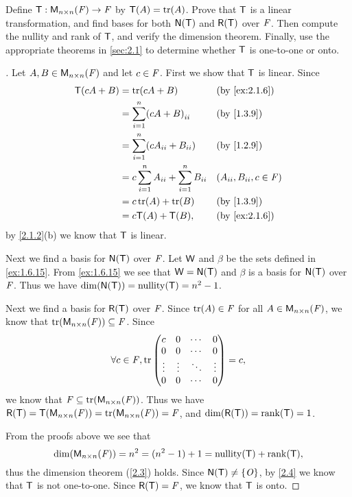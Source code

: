 \exercisesection

\setcounter{ex}{5}
\begin{ex}\label{ex:2.1.6}
	Define \(\T : \ms[n][n][\F] \to \F\) by \(\T(A) = \tr[A]\).
	Prove that \(\mathsf{T}\) is a linear transformation, and find bases for both \(\ns{\T}\) and \(\rg{\T}\) over \(\mathit{F}\).
	Then compute the nullity and rank of \(\mathsf{T}\), and verify the dimension theorem.
	Finally, use the appropriate theorems in \cref{sec:2.1} to determine whether \(\mathsf{T}\) is one-to-one or onto.
\end{ex}

\begin{proof}[]
	Let \(A, B \in \ms[n][n][\F]\) and let \(c \in \mathit{F}\).
	First we show that \(\mathsf{T}\) is linear.
	Since
	\begin{align*}
		\T(cA + B) & = \tr[cA + B]                                       &  & \by{ex:2.1.6}                \\
		           & = \sum_{i = 1}^n \pa{cA + B}_{i i}                  &  & \by{1.3.9}                   \\
		           & = \sum_{i = 1}^n \pa{cA_{i i} + B_{i i}}            &  & \by{1.2.9}                   \\
		           & = c \sum_{i = 1}^n A_{i i} + \sum_{i = 1}^n B_{i i} &  & (A_{i i}, B_{i i}, c \in \F) \\
		           & = c \tr[A] + \tr[B]                                 &  & \by{1.3.9}                   \\
		           & = c \T(A) + \T(B),                                  &  & \by{ex:2.1.6}
	\end{align*}
	by \cref{2.1.2}(b) we know that \(\mathsf{T}\) is linear.

	Next we find a basis for \(\ns{\T}\) over \(\mathit{F}\).
	Let \(\mathsf{W}\) and \(\beta\) be the sets defined in \cref{ex:1.6.15}.
	From \cref{ex:1.6.15} we see that \(\W = \ns{\T}\) and \(\beta\) is a basis for \(\ns{\T}\) over \(\mathit{F}\).
	Thus we have \(\dim(\ns{\T}) = \nt{\T} = n^2 - 1\).

	Next we find a basis for \(\rg{\T}\) over \(\mathit{F}\).
	Since \(\tr[A] \in \F\) for all \(A \in \ms[n][n][\F]\), we know that \(\tr[\ms[n][n][\F]] \subseteq \F\).
	Since
	\[
		\forall c \in \F, \tr\begin{pmatrix}
			c      & 0      & \cdots & 0      \\
			0      & 0      & \cdots & 0      \\
			\vdots & \vdots & \ddots & \vdots \\
			0      & 0      & \cdots & 0
		\end{pmatrix} = c,
	\]
	we know that \(\F \subseteq \tr[\ms[n][n][\F]]\).
	Thus we have \(\rg{\T} = \T(\ms[n][n][\F]) = \tr[\ms[n][n][\F]] = \F\), and \(\dim(\rg{\T}) = \rk{\T} = 1\).

	From the proofs above we see that
	\[
		\dim(\ms[n][n][\F]) = n^2 = (n^2 - 1) + 1 = \nt{\T} + \rk{\T},
	\]
	thus the dimension theorem (\cref{2.3}) holds.
	Since \(\ns{\T} \neq \set{\zm}\), by \cref{2.4} we know that \(\mathsf{T}\) is not one-to-one.
	Since \(\rg{\T} = \F\), we know that \(\mathsf{T}\) is onto.
\end{proof}

